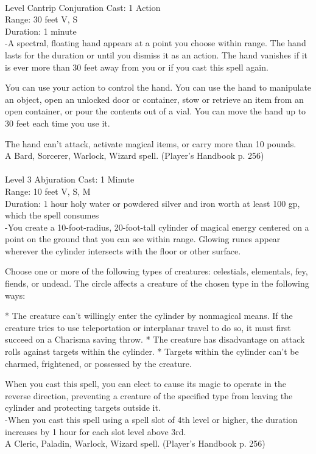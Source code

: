 \documentclass[10pt,twocolumn]{report}
\begin{document}
 \\
Level Cantrip \quad Conjuration \quad Cast: 1 Action\\
Range: 30 feet \quad V, S\\
Duration: 1 minute \quad \\
-A spectral, floating hand appears at a point you choose within range.
The hand lasts for the duration or until you dismiss it as an action. The hand vanishes if it is ever more than 30 feet away from you or if you cast this spell again.

You can use your action to control the hand. You can use the hand to manipulate an object, open an unlocked door or container, stow or retrieve an item from an open container, or pour the contents out of a vial. You can move the hand up to 30 feet each time you use it.

The hand can’t attack, activate magical items, or carry more than 10 pounds.\\
A Bard, Sorcerer, Warlock, Wizard spell. (Player's Handbook p. 256) \\


 \\
Level 3 \quad Abjuration \quad Cast: 1 Minute\\
Range: 10 feet \quad V, S, M\\
Duration: 1 hour \quad holy water or powdered silver and iron worth at least 100 gp, which the spell consumes\\
-You create a 10-foot-radius, 20-foot-tall cylinder of magical energy centered on a point on the ground that you can see within range. Glowing runes appear wherever the cylinder intersects with the floor or other surface.

Choose one or more of the following types of creatures: celestials, elementals, fey, fiends, or undead. The circle affects a creature of the chosen type in the following ways:

* The creature can’t willingly enter the cylinder by nonmagical means. If the creature tries to use teleportation or interplanar travel to do so, it must first succeed on a Charisma saving throw.
* The creature has disadvantage on attack rolls against targets within the cylinder.
* Targets within the cylinder can’t be charmed, frightened, or possessed by the creature.

When you cast this spell, you can elect to cause its magic to operate in the reverse direction, preventing a creature of the specified type from leaving the cylinder and protecting targets outside it.\\
-When you cast this spell using a spell slot of 4th level or higher, the duration increases by 1 hour for each slot level above 3rd.\\
A Cleric, Paladin, Warlock, Wizard spell. (Player's Handbook p. 256) \\
\end{document}
